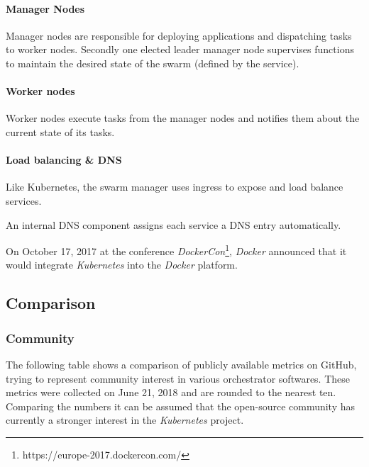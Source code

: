 \paragraph{Manager Nodes}\label{manager-nodes}

Manager nodes are responsible for deploying applications and dispatching
tasks to worker nodes. Secondly one elected leader manager node
supervises functions to maintain the desired state of the swarm (defined
by the service). \cite{dock-swarm}

\paragraph{Worker nodes}\label{worker-nodes}

Worker nodes execute tasks from the manager nodes and notifies them
about the current state of its tasks.\cite{dock-swarm}

\paragraph{Load balancing \& DNS}\label{load-balancing-dns}

Like Kubernetes, the swarm manager uses ingress to expose and load
balance services.

An internal DNS component assigns each service a DNS entry
automatically. \cite{dock-swarm}

On October 17, 2017 at the conference \emph{DockerCon}\footnote{https://europe-2017.dockercon.com/},
\emph{Docker} announced that it would integrate \emph{Kubernetes} into
the \emph{Docker} platform.

\subsection{Comparison}\label{comparison}

\subsubsection{Community}\label{community}

The following table shows a comparison of publicly available metrics on
GitHub, trying to represent community interest in various orchestrator
softwares. These metrics were collected on June 21, 2018 and are rounded
to the nearest ten. Comparing the numbers it can be assumed that the
open-source community has currently a stronger interest in the
\emph{Kubernetes} project.

